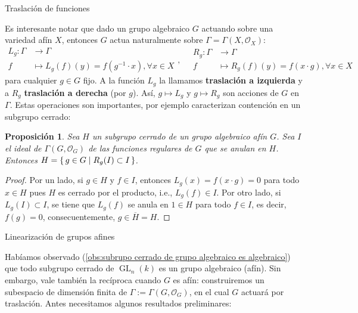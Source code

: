 \documentclass[spanish,10pt]{amsart}
\makeatletter
\renewcommand\subsection{\@startsection{subsection}{2}%
  \z@{.5\linespacing\@plus.7\linespacing}{-.5em}%
  {\normalfont\sffamily}}
\newtheorem{proposition}[theorem]{Proposición}
\theoremstyle{definition}
\theoremstyle{remark}
\numberwithin{equation}{section}
\renewcommand{\bar}[1]{\overline{#1}}
\renewcommand{\O}{\mathcal{O}}
\makeatother
\begin{document}
\subsection{Traslación de funciones}

Es interesante notar que dado un grupo algebraico $G$ actuando sobre una variedad afín $X$, entonces $G$ actua naturalmente sobre $\Gamma = \Gamma (X, \O_X)$:
\[
    \begin{array}{rl}
    L_g : \Gamma &\longrightarrow \Gamma \\
f &\longmapsto L_g (f) (y) = f(g^{-1} \cdot x) , \forall x \in X
    \end{array}, \quad
    \begin{array}{rl}
    R_g : \Gamma &\longrightarrow \Gamma \\
f &\longmapsto R_g (f) (y) = f(x \cdot g) , \forall x \in X
    \end{array}
\]
para cualquier $g \in G$ fijo. A la función $L_g$ la llamamos \textbf{traslación a izquierda} y a $R_g$ \textbf{traslación a derecha} (por $g$). Así, $g \mapsto L_g$ y $g \mapsto R_g$ son acciones de $G$ en $\Gamma$. Estas operaciones son importantes, por ejemplo caracterizan contención en un subgrupo cerrado:

\begin{proposition}\label{proposition:sea H subgrupo cerrado de grupo algebraico afin G entonces el ideal I de las funciones que se anulan en H determina H por traslacion}
Sea $H$ un subgrupo cerrado de un grupo algebraico afín $G$. Sea $I$ el ideal de $\Gamma (G, \O_G)$ de las funciones regulares de $G$ que se anulan en $H$. Entonces $H = \set{g \in G | R_g (I) \subset I}$.
\end{proposition}
\begin{proof}
Por un lado, si $g \in H$ y $f \in I$, entonces $L_g (x) = f(x \cdot g) = 0$ para todo $x \in H$ pues $H$ es cerrado por el producto, i.e., $L_g (f) \in I$. Por otro lado, si $L_g (I) \subset I$, se tiene que $L_g (f)$ se anula en $1 \in H$ para todo $f \in I$, es decir, $f(g) = 0$, consecuentemente, $g \in \bar H = H$.
\end{proof}



\subsection{Linearización de grupos afines}

Habíamos observado (\ref{obs:subrupo cerrado de grupo algebraico es algebraico}) que todo subgrupo cerrado de $\operatorname{GL}_n (k)$ es un grupo algebraico (afín). Sin embargo, vale también la recíproca cuando $G$ es afín: construiremos un subespacio de dimensión finita de $\Gamma := \Gamma (G, \O_G)$, en el cual $G$ actuará por traslación. Antes necesitamos algunos resultados preliminares:
\end{document}
